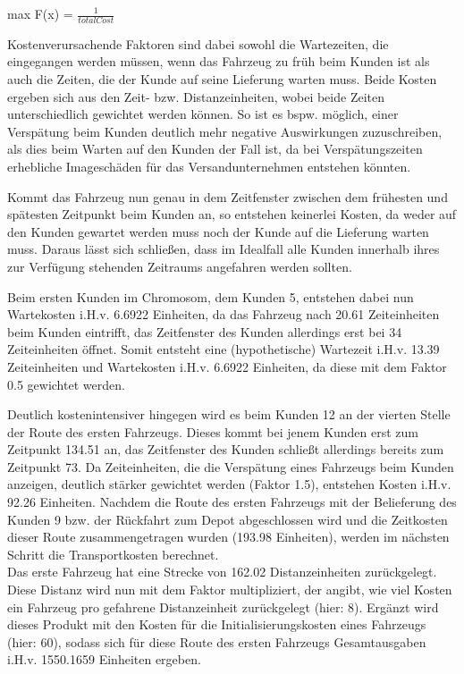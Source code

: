 \documentclass[a4paper,12pt,parskip,bibtotoc,liststotoc]{article}
\begin{document}
\begin{center}
max F(x) = $\frac{1}{totalCost}$
\end{center}

Kostenverursachende Faktoren sind dabei sowohl die Wartezeiten, die eingegangen werden müssen, wenn das Fahrzeug zu früh beim Kunden ist als auch die Zeiten, die der Kunde auf seine Lieferung warten muss. 
Beide Kosten ergeben sich aus den Zeit- bzw. Distanzeinheiten, wobei beide Zeiten unterschiedlich gewichtet werden können. 
So ist es bspw. möglich, einer Verspätung beim Kunden deutlich mehr negative Auswirkungen zuzuschreiben, als dies beim Warten auf den Kunden der Fall ist, da bei Verspätungszeiten erhebliche Imageschäden für das Versandunternehmen entstehen könnten.

Kommt das Fahrzeug nun genau in dem Zeitfenster zwischen dem frühesten und spätesten Zeitpunkt beim Kunden an, so entstehen keinerlei Kosten, da weder auf den Kunden gewartet werden muss noch der Kunde auf die Lieferung warten muss.
Daraus lässt sich schließen, dass im Idealfall alle Kunden innerhalb ihres zur Verfügung stehenden Zeitraums angefahren werden sollten.

Beim ersten Kunden im Chromosom, dem Kunden 5, entstehen dabei nun Wartekosten i.H.v. 6.6922 Einheiten, da das Fahrzeug nach 20.61 Zeiteinheiten beim Kunden eintrifft, das Zeitfenster des Kunden allerdings erst bei 34 Zeiteinheiten öffnet.
Somit entsteht eine (hypothetische) Wartezeit i.H.v. 13.39 Zeiteinheiten und Wartekosten i.H.v. 6.6922 Einheiten, da diese mit dem Faktor 0.5 gewichtet werden. 

Deutlich kostenintensiver hingegen wird es beim Kunden 12 an der vierten Stelle der Route des ersten Fahrzeugs. 
Dieses kommt bei jenem Kunden erst zum Zeitpunkt 134.51 an, das Zeitfenster des Kunden schließt allerdings bereits zum Zeitpunkt 73.
Da Zeiteinheiten, die die Verspätung eines Fahrzeugs beim Kunden anzeigen, deutlich stärker gewichtet werden (Faktor 1.5), entstehen Kosten i.H.v. 92.26 Einheiten.
Nachdem die Route des ersten Fahrzeugs mit der Belieferung des Kunden 9 bzw. der Rückfahrt zum Depot abgeschlossen wird und die Zeitkosten dieser Route zusammengetragen wurden (193.98 Einheiten), werden im nächsten Schritt die Transportkosten berechnet.\\

Das erste Fahrzeug hat eine Strecke von 162.02 Distanzeinheiten zurückgelegt.
Diese Distanz wird nun mit dem Faktor multipliziert, der angibt, wie viel Kosten ein Fahrzeug pro gefahrene Distanzeinheit zurückgelegt (hier: 8).
Ergänzt wird dieses Produkt mit den Kosten für die Initialisierungskosten eines Fahrzeugs (hier: 60), sodass sich für diese Route des ersten Fahrzeugs Gesamtausgaben i.H.v. 1550.1659 Einheiten ergeben.
\end{document}
